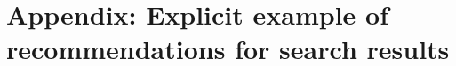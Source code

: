 \documentclass[a4paper,debug,notitlepage,nobib]{tufte-book}
\begin{document}
\chapter{Appendix: Explicit example of recommendations for search results}
\label{app:ExampleRec_Appendix}


% 
% 
%
%
%
%
%
\printbibliography
\end{document}
